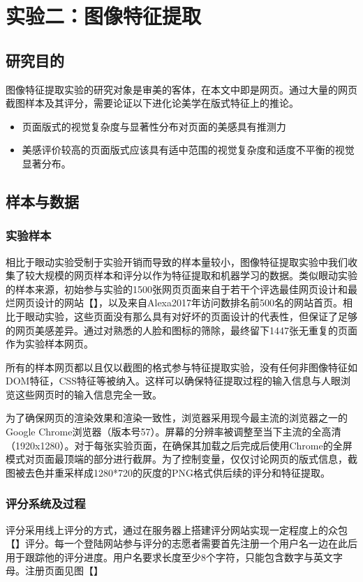 \chapter{实验二：图像特征提取}
\label{chap:exp2}

\section{研究目的}
图像特征提取实验的研究对象是审美的客体，在本文中即是网页。通过大量的网页截图样本及其评分，需要论证以下进化论美学在版式特征上的推论。

\begin{itemize}
  \item 页面版式的视觉复杂度与显著性分布对页面的美感具有推测力
  \item 美感评价较高的页面版式应该具有适中范围的视觉复杂度和适度不平衡的视觉显著分布。
\end{itemize}

\section{样本与数据}
\subsection{实验样本}
相比于眼动实验受制于实验开销而导致的样本量较小，图像特征提取实验中我们收集了较大规模的网页样本和评分以作为特征提取和机器学习的数据。类似眼动实验的样本来源，初始参与实验的1500张网页页面来自于若干个评选最佳网页设计和最烂网页设计的网站【】，以及来自Alexa2017年访问数排名前500名的网站首页。相比于眼动实验，这些页面没有那么具有对好坏的页面设计的代表性，但保证了足够的网页美感差异。通过对熟悉的人脸和图标的筛除，最终留下1447张无重复的页面作为实验样本网页。

所有的样本网页都以且仅以截图的格式参与特征提取实验，没有任何非图像特征如DOM特征，CSS特征等被纳入。这样可以确保特征提取过程的输入信息与人眼浏览这些网页时的输入信息完全一致。

为了确保网页的渲染效果和渲染一致性，浏览器采用现今最主流的浏览器之一的Google Chrome浏览器（版本号57）。屏幕的分辨率被调整至当下主流的全高清（1920x1280）。对于每张实验页面，在确保其加载之后完成后使用Chrome的全屏模式对页面最顶端的部分进行截屏。为了控制变量，仅仅讨论网页的版式信息，截图被去色并重采样成1280*720的灰度的PNG格式供后续的评分和特征提取。

\subsection{评分系统及过程}
评分采用线上评分的方式，通过在服务器上搭建评分网站实现一定程度上的众包【】评分。每一个登陆网站参与评分的志愿者需要首先注册一个用户名一边在此后用于跟踪他的评分进度。用户名要求长度至少8个字符，只能包含数字与英文字母。注册页面见图【】

